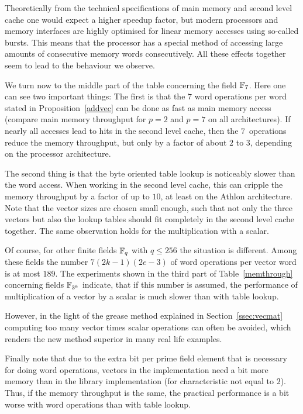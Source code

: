 Theoretically from the technical specifications of main memory and second
level cache one would expect a higher speedup factor, but modern
processors and memory interfaces are highly optimised for 
linear memory accesses using so-called bursts. This means that the
processor has a special method of accessing large amounts of consecutive
memory words consecutively. All these effects together seem to lead
to the behaviour we observe.

We turn now to the middle part of the table concerning the field $\mathbb{F}_7$.
Here one can see two important things: The first is that the $7$ word
operations per word stated in Proposition~\ref{addvec} can be done as
fast as main memory access (compare main memory throughput for $p=2$ and
$p=7$ on all architectures). If nearly all accesses lead to hits in 
the second level cache, then the $7$~operations reduce the memory
throughput, but only by a factor of about $2$ to $3$, depending on
the processor architecture.

The second thing is that the byte oriented table lookup is noticeably
slower than the word access. When working in the second level cache,
this can cripple the memory throughput by a factor of up to $10$, at least on
the Athlon architecture. Note that the vector sizes are chosen small
enough, such that not only the three vectors but also the lookup tables
should fit completely in the second level cache together.
The same observation holds for the multiplication with a scalar. 

Of course, for other finite fields $\mathbb{F}_q$ with $q \le 256$ the situation
is different. Among these fields the number $7(2k-1)(2e-3)$ of word
operations per vector word is at most $189$. The experiments shown in
the third part of Table~\ref{memthrough} concerning fields $\mathbb{F}_{3^k}$ 
indicate, that
if this number is assumed, the performance of multiplication of a vector
by a scalar is much slower than with table lookup. 

However, in the light of the grease method explained in
Section~\ref{ssec:vecmat} computing too many vector times scalar 
operations can often be avoided, which renders the new method
superior in many real life examples.

Finally note that due to the extra bit per prime field element that
is necessary for doing word operations, vectors in the {\cvec}
implementation need a bit more memory than in the {\GAP} library
implementation (for characteristic not equal to $2$).
Thus, if the memory throughput is the same, the practical performance is 
a bit worse with word operations than with table lookup.

